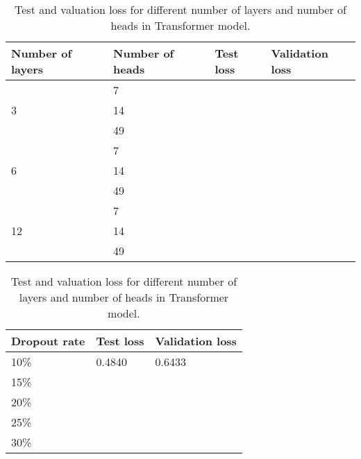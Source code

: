 \begin{table}[]
	\centering
	\begin{tabular}{|l|l|l|l|}
		\hline
		Number of layers    & Number of heads & Test loss & Validation loss \\ \hline
		\multirow{3}{*}{3}  & 7               &           &                 \\ \cline{2-4} 
		& 14              &           &                 \\ \cline{2-4} 
		& 49              &           &                 \\ \hline
		\multirow{3}{*}{6}  & 7               &           &                 \\ \cline{2-4} 
		& 14              &           &                 \\ \cline{2-4} 
		& 49              &           &                 \\ \hline
		\multirow{3}{*}{12} & 7               &           &                 \\ \cline{2-4} 
		& 14              &           &                 \\ \cline{2-4} 
		& 49              &           &                 \\ \hline
	\end{tabular}
	\caption{Test and valuation loss for different number of layers and number of heads in Transformer model.}
	\label{tab:transformer_train}
\end{table}

\begin{table}[]
	\centering
	\begin{tabular}{|l|l|l|}
		\hline
		Dropout rate & Test loss & Validation loss \\ \hline
		10\%         & 0.4840    & 0.6433                \\ \hline
		15\%         &           &                 \\ \hline
		20\%         &           &                 \\ \hline
		25\%         &           &                 \\ \hline
		30\%         &           &                 \\ \hline 
	\end{tabular}
	\caption{Test and valuation loss for different number of layers and number of heads in Transformer model.}
	\label{tab:transformer_dropout}
\end{table}